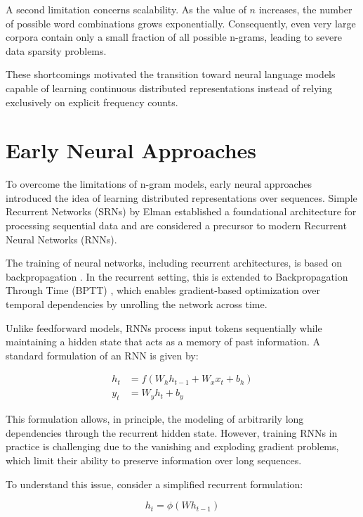 A second limitation concerns scalability. As the value of $n$ increases, the number of possible word combinations grows exponentially. Consequently, even very large corpora contain only a small fraction of all possible n-grams, leading to severe data sparsity problems.

These shortcomings motivated the transition toward neural language models capable of learning continuous distributed representations instead of relying exclusively on explicit frequency counts.


\section{Early Neural Approaches}

To overcome the limitations of n-gram models, early neural approaches introduced the idea of learning distributed representations over sequences. Simple Recurrent Networks (SRNs) by Elman \cite{elman1990finding} established a foundational architecture for processing sequential data and are considered a precursor to modern Recurrent Neural Networks (RNNs).

The training of neural networks, including recurrent architectures, is based on backpropagation \cite{rumelhart1986learning}. In the recurrent setting, this is extended to Backpropagation Through Time (BPTT) \cite{grosse2017lecture}, which enables gradient-based optimization over temporal dependencies by unrolling the network across time.

Unlike feedforward models, RNNs process input tokens sequentially while maintaining a hidden state that acts as a memory of past information. A standard formulation of an RNN is given by:

\begin{align*}
h_t &= f(W_h h_{t-1} + W_x x_t + b_h) \\
y_t &= W_y h_t + b_y
\end{align*}

This formulation allows, in principle, the modeling of arbitrarily long dependencies through the recurrent hidden state. However, training RNNs in practice is challenging due to the vanishing and exploding gradient problems, which limit their ability to preserve information over long sequences.

To understand this issue, consider a simplified recurrent formulation:

\begin{equation*}
h_t = \phi(W h_{t-1})
\end{equation*}

